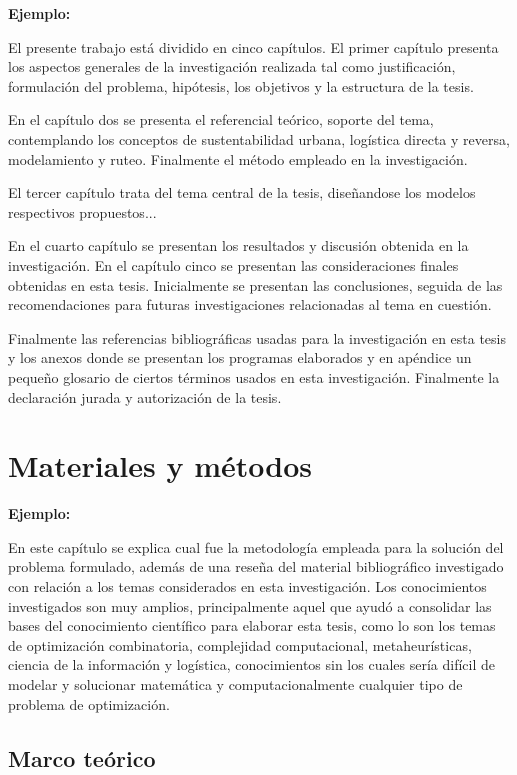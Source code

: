 {\bf Ejemplo:}\par
\vskip 0.1cm
El presente trabajo está dividido en cinco capítulos. El primer capítulo presenta los aspectos generales de la investigación realizada tal como justificación, formulación del problema, hipótesis, los objetivos y la estructura de la tesis.

En el capítulo dos se presenta el referencial teórico, soporte del tema, contemplando los conceptos de sustentabilidad urbana, logística directa y reversa, modelamiento y ruteo. Finalmente el método empleado en la investigación.

El tercer capítulo trata del tema central de la tesis, diseñandose los modelos respectivos propuestos...   

 En el cuarto capítulo se presentan los resultados y discusión obtenida en la investigación. En el capítulo cinco se presentan las consideraciones finales obtenidas en esta tesis. Inicialmente se presentan las conclusiones, seguida de las recomendaciones para futuras investigaciones relacionadas al tema en cuestión.

Finalmente las referencias bibliográficas usadas para la investigación en esta tesis y los anexos donde se presentan los programas elaborados y en apéndice un pequeño glosario de ciertos términos usados en esta investigación. Finalmente la declaración jurada y autorización de la tesis.




\chapter{Materiales y métodos}

{\bf Ejemplo:}\par

En este capítulo se explica cual fue la metodología empleada para la solución del problema formulado, además de una reseña del material bibliográfico investigado con relación a los temas considerados en esta investigación. Los conocimientos investigados son muy amplios, principalmente aquel que ayudó a consolidar las bases del conocimiento científico para elaborar esta tesis, como lo son los temas de optimización combinatoria, complejidad computacional, metaheurísticas, ciencia de la información y logística, conocimientos sin los cuales sería difícil de modelar y solucionar matemática y computacionalmente cualquier tipo de problema de optimización.


\section{Marco teórico}
